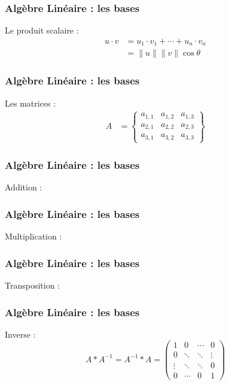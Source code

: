 \documentclass{formation}
\begin{document}
\begin{frame}
  \frametitle{Algèbre Linéaire : les bases}
  Le produit scalaire :
    \begin{align*}
      u\cdot v & = u_1\cdot v_1 + \dotsb + u_n \cdot v_n \\[4mm]
      & = \parallel u\parallel \parallel v\parallel \cos\theta
    \end{align*}
\end{frame}

\begin{frame}
  \frametitle{Algèbre Linéaire : les bases}
  Les matrices :
    \begin{align*}
      A & = 
      \begin{Bmatrix}
        a_{1,1} & a_{1,2} & a_{1,3} \\
        a_{2,1} & a_{2,2} & a_{2,3} \\
        a_{3,1} & a_{3,2} & a_{3,3}
      \end{Bmatrix}
    \end{align*}
\end{frame}

\begin{frame}
  \frametitle{Algèbre Linéaire : les bases}
  Addition :
\end{frame}


\begin{frame}
  \frametitle{Algèbre Linéaire : les bases}
  Multiplication :
  \begin{center}
  \end{center}
\end{frame}

\begin{frame}
  \frametitle{Algèbre Linéaire : les bases}
  Transposition :
\end{frame}

\begin{frame}
  \frametitle{Algèbre Linéaire : les bases}
  Inverse : \\
  \[
  A*A^{-1} = A^{-1}*A =
  \begin{pmatrix}
    1 & 0 & \cdots & 0 \\
    0 & \ddots & \ddots & \vdots \\
    \vdots & \ddots & \ddots & 0\\
    0 & \cdots & 0 & 1
  \end{pmatrix}
  \]
\end{frame}
\end{document}
